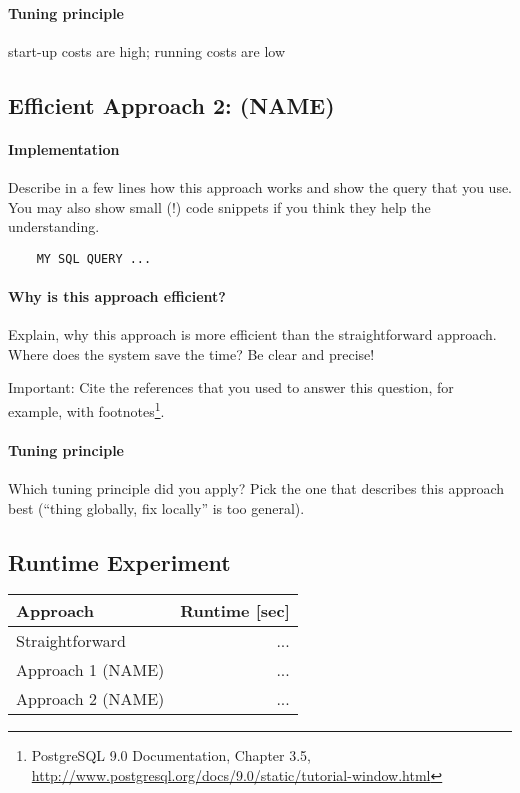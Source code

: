 \documentclass[11pt]{scrartcl}
\begin{document}
  \paragraph{Tuning principle}

  start-up costs are high; running costs are low

    \subsection*{Efficient Approach 2: (NAME)}

  \paragraph{Implementation}

  Describe in a few lines how this approach works and show the query
  that you use. You may also show small (!) code snippets if you think
  they help the understanding.

{\small
\begin{verbatim}
    MY SQL QUERY ...
\end{verbatim}
}

  \paragraph{Why is this approach efficient?}

  Explain, why this approach is more efficient than the
  straightforward approach. Where does the system save the time? Be
  clear and precise!
  
  Important: Cite the references that you used to answer this
  question, for example, with footnotes\footnote{PostgreSQL 9.0
    Documentation, Chapter 3.5,
    \url{http://www.postgresql.org/docs/9.0/static/tutorial-window.html}}.

  \paragraph{Tuning principle}

  Which tuning principle did you apply? Pick the one that describes
  this approach best (``thing globally, fix locally'' is too general).

  \subsection*{Runtime Experiment}

  \begin{table}[H]
  \begin{tabular}{l|r}
    Approach & Runtime [sec] \\
    \hline
    Straightforward & ... \\
    Approach 1 (NAME) & ... \\
    Approach 2 (NAME) & ...     
  \end{tabular}
  \end{table}
\end{document}
